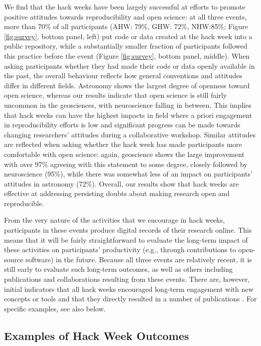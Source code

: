 We find that the hack weeks have been largely successful at efforts to promote positive attitudes towards reproducibility and open science: at all three events, more than 70\% of all participants (AHW: 79\%, GHW: 72\%, NHW:85\%; Figure \ref{fig:survey}, bottom panel, left) put code or data created at the hack week into a public repository, while a substantially smaller fraction of participants followed this practice before the event (Figure \ref{fig:survey}, bottom panel, middle).
When asking participants whether they had made their code or data openly available in the past, the overall behaviour reflects how general conventions and attitudes differ in different fields.
Astronomy shows the largest degree of openness toward open science, whereas our results indicate that open science is still fairly uncommon in the geosciences, with neuroscience falling in between.
This implies that hack weeks can have the highest impacts in field where a priori engagement in reproducibility efforts is low and significant progress can be made towards changing researchers' attitudes during a collaborative workshop.
Similar attitudes are reflected when asking whether the hack week has made participants more comfortable with open science: again, geoscience shows the large improvement with over 97\% agreeing with this statement to some degree, closely followed by neuroscience (95\%), while there was somewhat less of an impact on participants' attitudes in astronomy (72\%).
Overall, our results show that hack weeks are effective at addressing persisting doubts about making research open and reproducible.

From the very nature of the activities that we encourage in hack weeks, participants in these events produce digital records of their research online. This means that it will be fairly straightforward to evaluate the long-term impact of these activities on participants' productivity (e.g., through contributions to open-source software) in the future. Because all three events are relatively recent, it is still early to evaluate such long-term outcomes, as well as others including publications and collaborations resulting from these events.
There are, however, initial indicators that all hack weeks encouraged long-term engagement with new concepts or tools and that they directly resulted in a number of publications \cite{gullysantiago2015,faria2016,keshavan2017,leonard2017,jordan2017,peterson2017,hahn2017,pricewhelan2017}. For specific examples, see also below.

\subsection*{Examples of Hack Week Outcomes}
\label{sec:outcomes}

